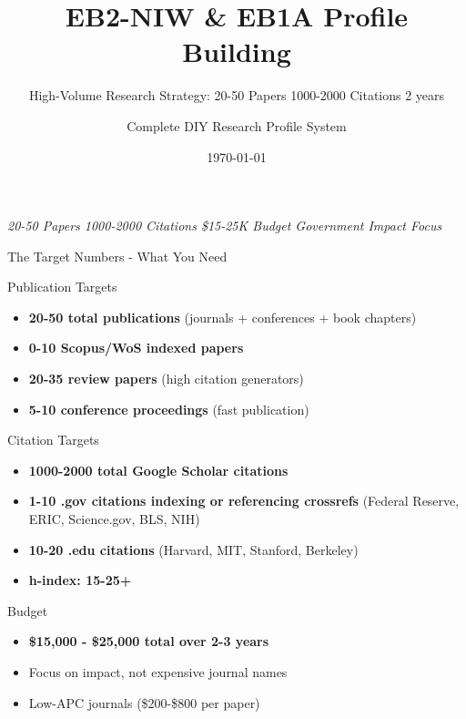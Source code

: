 \documentclass[11pt]{beamer}
\title{EB2-NIW \& EB1A Profile Building}
\subtitle{High-Volume Research Strategy: 20-50 Papers  1000-2000 Citations 2 years}
\author{Complete DIY Research Profile System}
\date{\today}
\begin{document}
	
	\begin{frame}
		\titlepage
		\centering
		\scriptsize \textit{20-50 Papers  1000-2000 Citations   \$15-25K Budget   Government Impact Focus}
	\end{frame}
	
	\begin{frame}{The Target Numbers - What You Need}
		\scriptsize
		\begin{block}{Publication Targets}
			\begin{itemize}
				\item \textbf{20-50 total publications} (journals + conferences + book chapters)
				\item \textbf{0-10 Scopus/WoS indexed papers}
				\item \textbf{20-35 review papers} (high citation generators)
				\item \textbf{5-10 conference proceedings} (fast publication)
			\end{itemize}
		\end{block}
		\begin{block}{Citation Targets}
			\begin{itemize}
				\item \textbf{1000-2000 total Google Scholar citations}
				\item \textbf{1-10 .gov citations indexing or referencing crossrefs} (Federal Reserve, ERIC, Science.gov, BLS, NIH)
				\item \textbf{10-20 .edu citations} (Harvard, MIT, Stanford, Berkeley)
				\item \textbf{h-index: 15-25+}
			\end{itemize}
		\end{block}
		\begin{block}{Budget}
			\begin{itemize}
				\item \textbf{\$15,000 - \$25,000 total over 2-3 years}
				\item Focus on impact, not expensive journal names
				\item Low-APC journals (\$200-\$800 per paper)
			\end{itemize}
		\end{block}
	\end{frame}
	
\end{document}
